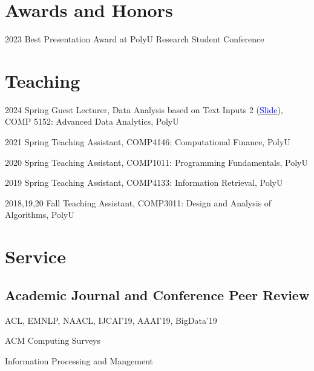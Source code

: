 \documentclass[12pt,letterpaper]{report}
\newcommand{\listitemspace}{0.5em}
\renewenvironment{itemize}
{\begin{list}{}{\setlength{\leftmargin}{0em}
                \setlength{\parskip}{0em}
                \setlength{\itemsep}{\listitemspace}
                \setlength{\parsep}{\listitemspace}}}
{\end{list}}
\begin{document}

    \section*{Awards and Honors}
    \begin{tablist}
        \item[2023] \tab{}Best Presentation Award at PolyU Research Student Conference 
    \end{tablist}

    \section*{Teaching}
    \begin{tablist}
        \item[2024 Spring] \tab{}Guest Lecturer, Data Analysis based on Text Inputs 2 (\href{https://preke.github.io/files/COMP5152-Lecture\%209.pdf}{\textcolor{blue}{Slide}}),\\ COMP 5152: Advanced Data Analytics, PolyU
        \item[2021 Spring] \tab{}Teaching Assistant, COMP4146: Computational Finance, PolyU
        \item[2020 Spring] \tab{}Teaching Assistant, COMP1011: Programming Fundamentals, PolyU
        \item[2019 Spring] \tab{}Teaching Assistant, COMP4133: Information Retrieval, PolyU
        \item[2018,19,20 Fall] \tab{}Teaching Assistant, COMP3011: Design and Analysis of Algorithms, PolyU
        
    \end{tablist}

    \section*{Service}
    \subsection*{Academic Journal and Conference Peer Review}
    \begin{itemize}
        \item ACL, EMNLP, NAACL, IJCAI'19, AAAI'19, BigData'19
        \item ACM Computing Surveys
        \item Information Processing and Mangement
    \end{itemize}
\end{document}
